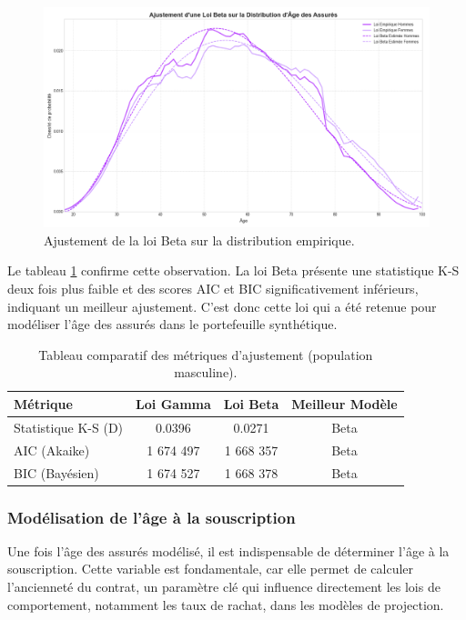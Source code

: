 \begin{figure}[H]
\centering
\includegraphics[width=0.8 \textwidth]{images/2_chapitres/chapitre3/estimation_loi_beta.png}
\caption{Ajustement de la loi Beta sur la distribution empirique.}
\label{fig:beta}
\end{figure}

Le tableau \ref{tab:stats} confirme cette observation. La loi Beta présente une statistique K-S deux fois plus faible et des scores AIC et BIC significativement inférieurs, indiquant un meilleur ajustement. C'est donc cette loi qui a été retenue pour modéliser l'âge des assurés dans le portefeuille synthétique.

\begin{table}[H]
\centering
\begin{tabular}{@{}lccc@{}}
\toprule
\textbf{Métrique} & \textbf{Loi Gamma} & \textbf{Loi Beta} & \textbf{Meilleur Modèle} \\
\midrule
Statistique K-S (D) & 0.0396 & 0.0271 & Beta \\
AIC (Akaike) & 1 674 497 & 1 668 357 & Beta \\
BIC (Bayésien) & 1 674 527 & 1 668 378 & Beta \\
\bottomrule
\end{tabular}
\caption{Tableau comparatif des métriques d'ajustement (population masculine).}
\label{tab:stats}
\end{table}

\subsubsection{Modélisation de l'âge à la souscription}
Une fois l'âge des assurés modélisé, il est indispensable de déterminer l'âge à la souscription. Cette variable est fondamentale, car elle permet de calculer l'ancienneté du contrat, un paramètre clé qui influence directement les lois de comportement, notamment les taux de rachat, dans les modèles de projection.

